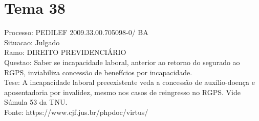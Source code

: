 \documentclass[12pt]{article}
\begin{document}
\section*{Tema 38}
Processo: PEDILEF 2009.33.00.705098-0/ BA\\
Situacao: Julgado\\
Ramo: DIREITO PREVIDENCIÁRIO\\
Questao: Saber se incapacidade laboral, anterior ao retorno do segurado ao RGPS, inviabiliza concessão de benefícios por incapacidade.\\
Tese: A incapacidade laboral preeexistente veda a concessão de auxílio-doença e aposentadoria por invalidez, mesmo nos casos de reingresso no RGPS. Vide Súmula 53 da TNU.\\
Fonte: https://www.cjf.jus.br/phpdoc/virtus/
\end{document}
